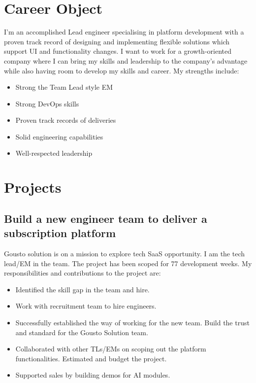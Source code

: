 \documentclass[a4paper]{twentysecondcv-english} %
\begin{document}
\section{Career Object}

I'm an accomplished Lead engineer specialising in platform development with a proven track record of designing and implementing flexible solutions which support UI and functionality changes. I want to work for a growth-oriented company where I can bring my skills and leadership to the company's advantage while also having room to develop my skills and career. My strengths include:
\begin{itemize}
  \item Strong the Team Lead style EM
  \item Strong DevOps skills
  \item Proven track records of deliveries
  \item Solid engineering capabilities
  \item Well-respected leadership
\end{itemize}

\section{Projects}

\subsection{Build a new engineer team to deliver a subscription platform}

Gousto solution is on a mission to explore tech SaaS opportunity. I am the tech lead/EM in the team. The project has been scoped for 77 development weeks. My responsibilities and contributions to the project are:
\begin{itemize}
    \item Identified the skill gap in the team and hire.
    \item Work with recruitment team to hire engineers.
    \item Successfully established the way of working for the new team. Build the trust and standard for the Gousto Solution team.
    \item Collaborated with other TLs/EMs on scoping out the platform functionalities. Estimated and budget the project.
    \item Supported sales by building demos for AI modules.
\end{itemize}
\end{document}
